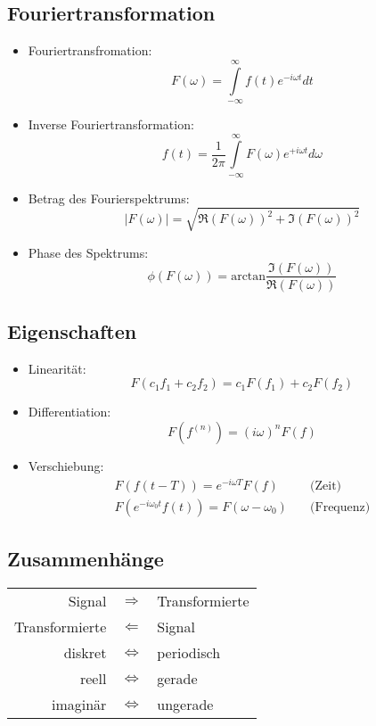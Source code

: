 \subsection{Fouriertransformation}
\begin{itemize}
\item Fouriertransfromation: $$F(\omega) = \int\limits_{- \infty}^{\infty} f(t) e^{-i \omega t} dt$$
\item Inverse Fouriertransformation: $$f(t) = \frac{1}{2 \pi} \int\limits_{- \infty}^{\infty} F(\omega) e^{+i \omega t} d \omega$$
\item Betrag des Fourierspektrums: $$|F(\omega)| = \sqrt{\Re(F(\omega))^2 + \Im(F(\omega))^2}$$
\item Phase des Spektrums: $$\phi(F(\omega)) = \textrm{arctan}\frac{\Im(F(\omega))}{\Re(F(\omega))}$$
\end{itemize}

\subsection{Eigenschaften}
\begin{itemize}
\item Linearität: $$F(c_1f_1 + c_2f_2) = c_1F(f_1) + c_2F(f_2)$$
\item Differentiation: $$F(f^{(n)}) = (i \omega)^n F(f)$$
\item Verschiebung: $$\begin{array}{cl} F(f(t-T)) = e^{-i \omega T} F(f) & \quad \textrm{(Zeit)} \\ F(e^{-i \omega_0 t} f(t)) = F(\omega - \omega_0) & \quad \textrm{(Frequenz)} \end{array}$$
\end{itemize}

\subsection{Zusammenhänge}
\begin{center}
\begin{tabular}{rcl}
Signal & $\Rightarrow$ & Transformierte \\ Transformierte & $\Leftarrow$ & Signal \\[0,1cm] diskret & $\Leftrightarrow$ & periodisch \\ reell & $\Leftrightarrow$ & gerade \\ imaginär & $\Leftrightarrow$ & ungerade
\end{tabular}
\end{center}

